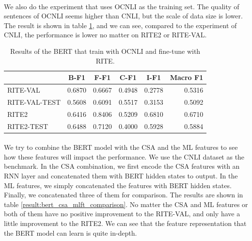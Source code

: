 \documentclass[12pt]{article}
\begin{document}
\begin{CJK*}{UTF8}{bkai}
\begin{spacing}{1.77}
\paragraph{}
We also do the experiment that uses OCNLI as the training set. The quality of sentences of OCNLI seems higher than CNLI, but the scale of data size is lower. The result is shown in table \ref{result:bert_ocnli_transfer}, and we can see, compared to the experiment of CNLI, the performance is lower no matter on RITE2 or RITE-VAL.

\begin{table}[ht!]
  \centering
  \begin{tabular}{|l|r|r|r|r|r|}
  \hline
   & \multicolumn{1}{c|}{B-F1} & \multicolumn{1}{c|}{F-F1} & \multicolumn{1}{c|}{C-F1} & \multicolumn{1}{c|}{I-F1} & \multicolumn{1}{c|}{Macro F1} \\ \hline
  RITE-VAL & 0.6870 & 0.6667 & 0.4948 & 0.2778 & 0.5316 \\ \hline
  RITE-VAL-TEST & 0.5608 & 0.6091 & 0.5517 & 0.3153 & 0.5092 \\ \hline
  RITE2 & 0.6416 & 0.8406 & 0.5209 & 0.6810 & 0.6710 \\ \hline
  RITE2-TEST & 0.6488 & 0.7120 & 0.4000 & 0.5928 & 0.5884 \\ \hline
  \end{tabular}
  \caption{Results of the BERT that train with OCNLI and fine-tune with RITE.}
  \label{result:bert_ocnli_transfer}
\end{table}

\paragraph{}
We try to combine the BERT model with the CSA and the ML features to see how these features will impact the performance. We use the CNLI dataset as the benchmark. In the CSA combination, we first encode the CSA features with an RNN layer and concatenated them with BERT hidden states to output. In the ML features, we simply concatenated the features with BERT hidden states. Finally, we concatenated three of them for comparison. The results are shown in table \ref{result:bert_csa_mlft_comparison}. No matter the CSA and ML features or both of them have no positive improvement to the RITE-VAL, and only have a little improvement to the RITE2. We can see that the feature representation that the BERT model can learn is quite in-depth.


\end{spacing}
\end{CJK*}
\end{document}
